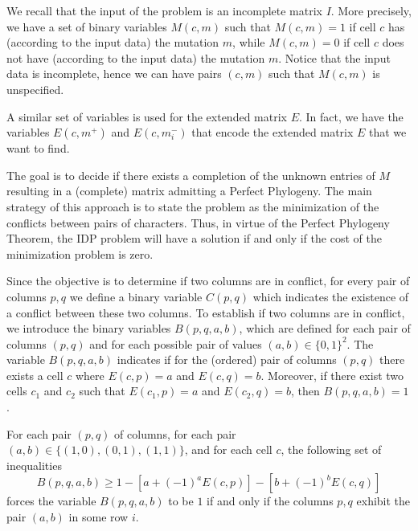 \documentclass[a4paper,USenglish]{article}
\theoremstyle{definition}
\begin{document}
We recall that the input of the problem is an incomplete matrix $I$.
More precisely, we have a set of binary variables $M(c,m)$ such that $M(c,m)=1$ if cell
$c$ has (according to the input data) the mutation $m$, while $M(c,m)=0$ if cell
$c$ does not have (according to the input data) the mutation $m$.
%
Notice that the input data is incomplete, hence we can have pairs $(c,m)$ such that
$M(c,m)$ is unspecified.


A similar set of variables is used for the extended matrix $E$.
In fact, we have the variables $E(c,m^{+})$ and $E(c,m_{i}^{-})$ that encode the extended
matrix $E$ that we want to find.


The goal is to decide if there exists a completion of the unknown
entries  of $M$ resulting in
a (complete) matrix  admitting a Perfect Phylogeny.
The main  strategy of  this approach  is to state  the problem  as the
  minimization of the conflicts between pairs of characters. 
Thus, in virtue of the  Perfect Phylogeny Theorem, the IDP problem
will have a solution if and only if the cost of the minimization problem
is zero.  




Since the objective is to determine if two columns are in conflict,
  for every pair of columns $p,q$ we define a  binary variable $C(p,q)$
  which indicates the existence of a conflict between these two columns.
To establish if two columns are in conflict, we introduce the binary variables 
   $B(p,q,a,b)$, which  are defined for each pair of columns $(p,q)$ and for each
   possible  pair  of  values  $(a,b)\in \{0,1\}^2$.
The variable $B(p,q,a,b)$ indicates if for the (ordered) pair of columns $(p,q)$
  there  exists a cell $c$ where $E(c,p)=a$ and $E(c,q)=b$.
Moreover, if there exist two cells $c_{1}$ and $c_{2}$ such that 
  $E(c_{1},p)=a$ and $E(c_{2},q)=b$, then $B(p,q,a,b)=1$.

For each pair $(p,q)$ of columns, for each pair $(a,b)\in
\{(1,0),(0,1),(1,1)\} $, and for each cell $c$, the following set of inequalities 
\begin{equation}\label{eq:B}
   B(p,q,a,b)\ge 1-[a+(-1)^{a} E(c,p)]-[b+(-1)^{b}
  E(c,q)]
  \end{equation}
  forces the variable $B(p,q,a,b)$ to be $1$ if and only if the columns $p,q$
  exhibit the pair $(a,b)$ in some row $i$.
\end{document}
